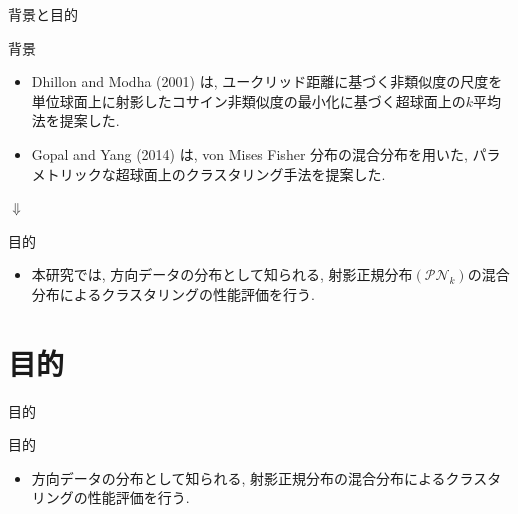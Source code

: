 \documentclass[dvipdfmx]{beamer} %
\begin{document}
\begin{frame}{背景と目的}

\begin{block}{背景}
\begin{itemize}
\item 
Dhillon and Modha (2001) は, ユークリッド距離に基づく非類似度の尺度を単位球面上に射影したコサイン非類似度の最小化に基づく超球面上の$k$平均法を提案した.
\vspace{0.2cm}
\item  
Gopal and Yang (2014) は, von Mises Fisher 分布の混合分布を用いた, パラメトリックな超球面上のクラスタリング手法を提案した.
\end{itemize}
\end{block}

\vspace{0.2cm}
\centering
{\LARGE $\Downarrow$}

\begin{block}{目的}
\begin{itemize}
\item
本研究では, 方向データの分布として知られる, 射影正規分布$(\mathcal{PN}_k)$の混合分布によるクラスタリングの性能評価を行う.
\end{itemize}
\end{block}
\end{frame}

\section{目的}
\begin{frame}{目的}
\begin{block}{目的}
\begin{itemize}

\item
方向データの分布として知られる, 射影正規分布の混合分布によるクラスタリングの性能評価を行う.

\end{itemize}
\end{block}
\end{frame}
\fi
\end{document}
